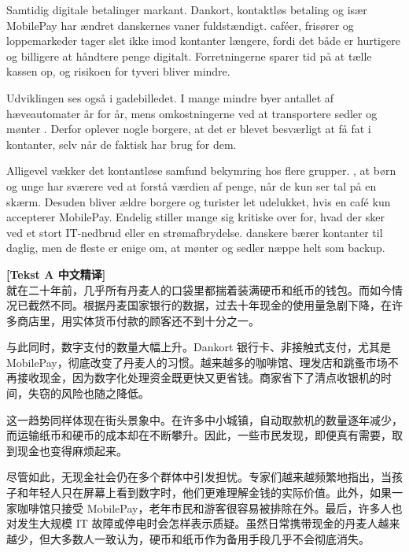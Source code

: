 Samtidig  digitale betalinger  markant. Dankort, kontaktløs betaling og især MobilePay har ændret danskernes vaner fuldstændigt.  caféer, frisører og loppemarkeder tager slet ikke imod kontanter længere, fordi det både er hurtigere og billigere at håndtere penge digitalt. Forretningerne sparer tid på at tælle kassen op, og risikoen for tyveri bliver mindre.

Udviklingen ses også i gadebilledet. I mange mindre byer  antallet af hæveautomater år for år, mens omkostningerne ved at transportere sedler og mønter . Derfor oplever nogle borgere, at det er blevet besværligt at få fat i kontanter, selv når de faktisk har brug for dem.

Alligevel vækker det kontantløse samfund bekymring hos flere grupper.  , at børn og unge har sværere ved at forstå værdien af penge, når de kun ser tal på en skærm. Desuden bliver ældre borgere og turister let udelukket, hvis en café kun accepterer MobilePay. Endelig stiller mange sig kritiske over for, hvad der sker ved et stort IT-nedbrud eller en strømafbrydelse.  danskere bærer kontanter til daglig, men de fleste er enige om, at mønter og sedler næppe  helt som backup.

\begin{transbox}
\small
\textbf{\color{NCDTeal}[Tekst A 中文精译]}\\
就在二十年前，几乎所有丹麦人的口袋里都揣着装满硬币和纸币的钱包。而如今情况已截然不同。根据丹麦国家银行的数据，过去十年现金的使用量急剧下降，在许多商店里，用实体货币付款的顾客还不到十分之一。

与此同时，数字支付的数量大幅上升。Dankort 银行卡、非接触式支付，尤其是 MobilePay，彻底改变了丹麦人的习惯。越来越多的咖啡馆、理发店和跳蚤市场不再接收现金，因为数字化处理资金既更快又更省钱。商家省下了清点收银机的时间，失窃的风险也随之降低。

这一趋势同样体现在街头景象中。在许多中小城镇，自动取款机的数量逐年减少，而运输纸币和硬币的成本却在不断攀升。因此，一些市民发现，即便真有需要，取到现金也变得麻烦起来。

尽管如此，无现金社会仍在多个群体中引发担忧。专家们越来越频繁地指出，当孩子和年轻人只在屏幕上看到数字时，他们更难理解金钱的实际价值。此外，如果一家咖啡馆只接受 MobilePay，老年市民和游客很容易被排除在外。最后，许多人也对发生大规模 IT 故障或停电时会怎样表示质疑。虽然日常携带现金的丹麦人越来越少，但大多数人一致认为，硬币和纸币作为备用手段几乎不会彻底消失。
\end{transbox}

